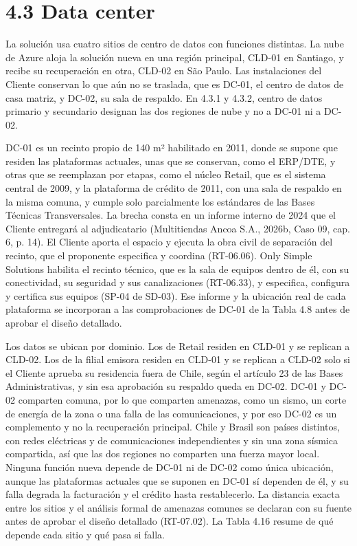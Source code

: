 \documentclass[11pt]{article}
\begin{document}
\section{4.3 Data center}

La solución usa cuatro sitios de centro de datos con funciones distintas. La nube de Azure aloja la solución nueva en una región principal, CLD-01 en Santiago, y recibe su recuperación en otra, CLD-02 en São Paulo. Las instalaciones del Cliente conservan lo que aún no se traslada, que es DC-01, el centro de datos de casa matriz, y DC-02, su sala de respaldo. En 4.3.1 y 4.3.2, centro de datos primario y secundario designan las dos regiones de nube y no a DC-01 ni a DC-02.

DC-01 es un recinto propio de 140 m² habilitado en 2011, donde se supone que residen las plataformas actuales, unas que se conservan, como el ERP/DTE, y otras que se reemplazan por etapas, como el núcleo Retail, que es el sistema central de 2009, y la plataforma de crédito de 2011, con una sala de respaldo en la misma comuna, y cumple solo parcialmente los estándares de las Bases Técnicas Transversales. La brecha consta en un informe interno de 2024 que el Cliente entregará al adjudicatario (Multitiendas Ancoa S.A., 2026b, Caso 09, cap. 6, p. 14). El Cliente aporta el espacio y ejecuta la obra civil de separación del recinto, que el proponente especifica y coordina (RT-06.06). Only Simple Solutions habilita el recinto técnico, que es la sala de equipos dentro de él, con su conectividad, su seguridad y sus canalizaciones (RT-06.33), y especifica, configura y certifica sus equipos (SP-04 de SD-03). Ese informe y la ubicación real de cada plataforma se incorporan a las comprobaciones de DC-01 de la Tabla 4.8 antes de aprobar el diseño detallado.

Los datos se ubican por dominio. Los de Retail residen en CLD-01 y se replican a CLD-02. Los de la filial emisora residen en CLD-01 y se replican a CLD-02 solo si el Cliente aprueba su residencia fuera de Chile, según el artículo 23 de las Bases Administrativas, y sin esa aprobación su respaldo queda en DC-02. DC-01 y DC-02 comparten comuna, por lo que comparten amenazas, como un sismo, un corte de energía de la zona o una falla de las comunicaciones, y por eso DC-02 es un complemento y no la recuperación principal. Chile y Brasil son países distintos, con redes eléctricas y de comunicaciones independientes y sin una zona sísmica compartida, así que las dos regiones no comparten una fuerza mayor local. Ninguna función nueva depende de DC-01 ni de DC-02 como única ubicación, aunque las plataformas actuales que se suponen en DC-01 sí dependen de él, y su falla degrada la facturación y el crédito hasta restablecerlo. La distancia exacta entre los sitios y el análisis formal de amenazas comunes se declaran con su fuente antes de aprobar el diseño detallado (RT-07.02). La Tabla 4.16 resume de qué depende cada sitio y qué pasa si falla.
\end{document}
